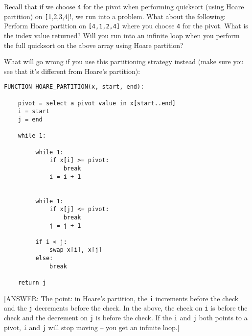 \newpage
\begin{ex}
Recall that if we choose \verb!4! for the pivot when performing
quicksort (using Hoare partition) on
\verb![!1,2,3,4]!, we run into a problem.
What about the following:
Perform Hoare partition on \verb![4,1,2,4]! where you choose
\verb!4! for the pivot.
What is the index value returned?
Will you run into an infinite loop when you perform the full
quicksort on the above array using Hoare partition?
\end{ex}
  

\newpage
\begin{ex}
What will go wrong if you use this partitioning strategy
instead (make sure you see that it's different from Hoare's partition):
\begin{Verbatim}[frame=single,fontsize=\footnotesize]
FUNCTION HOARE_PARTITION(x, start, end):

    pivot = select a pivot value in x[start..end]
    i = start
    j = end

    while 1:

         while 1:
             if x[i] >= pivot:
                 break
             i = i + 1


         while 1:
             if x[j] <= pivot:
                 break
             j = j + 1

         if i < j:
             swap x[i], x[j]
         else:                    
             break

    return j
\end{Verbatim}
\end{ex}

[ANSWER: The point: in Hoare's partition, the
\verb!i! increments before the check and the
\verb!j! decrements before the check.
In the above, the check on \verb!i! is before the check
and the decrement on \verb!j! is before the check.
If the \verb!i! and \verb!j! both points to a pivot,
\verb!i! and \verb!j! will stop moving -- you get an infinite loop.]
